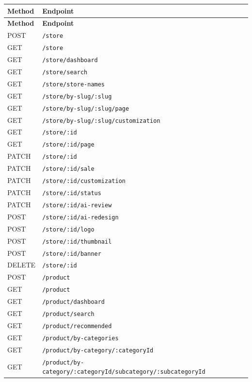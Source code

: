 \documentclass[12pt, a4paper, oneside]{report}
\begin{document}
\small
\setlength{\extrarowheight}{2pt}
\begin{longtable}{|>{\raggedright\arraybackslash}p{1.8cm}|>{\raggedright\arraybackslash}p{11cm}|}
\hline
\rowcolor{cheebolightgray}
\textbf{Method} & \textbf{Endpoint} \\
\hline
\endfirsthead
\hline
\rowcolor{cheebolightgray}
\textbf{Method} & \textbf{Endpoint} \\
\hline
\endhead
\hline
\endfoot
POST & \texttt{/store} \\
GET & \texttt{/store} \\
GET & \texttt{/store/dashboard} \\
GET & \texttt{/store/search} \\
GET & \texttt{/store/store-names} \\
GET & \texttt{/store/by-slug/:slug} \\
GET & \texttt{/store/by-slug/:slug/page} \\
GET & \texttt{/store/by-slug/:slug/customization} \\
GET & \texttt{/store/:id} \\
GET & \texttt{/store/:id/page} \\
PATCH & \texttt{/store/:id} \\
PATCH & \texttt{/store/:id/sale} \\
PATCH & \texttt{/store/:id/customization} \\
PATCH & \texttt{/store/:id/status} \\
PATCH & \texttt{/store/:id/ai-review} \\
POST & \texttt{/store/:id/ai-redesign} \\
POST & \texttt{/store/:id/logo} \\
POST & \texttt{/store/:id/thumbnail} \\
POST & \texttt{/store/:id/banner} \\
DELETE & \texttt{/store/:id} \\
\hline
POST & \texttt{/product} \\
GET & \texttt{/product} \\
GET & \texttt{/product/dashboard} \\
GET & \texttt{/product/search} \\
GET & \texttt{/product/recommended} \\
GET & \texttt{/product/by-categories} \\
GET & \texttt{/product/by-category/:categoryId} \\
GET & \texttt{/product/by-category/:categoryId/subcategory/:subcategoryId} \\

\end{longtable}
\end{document}
